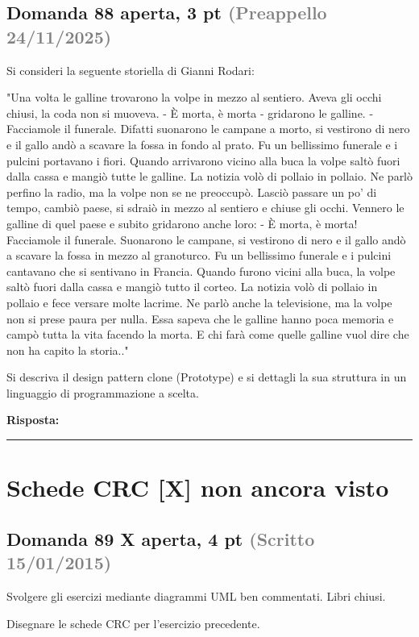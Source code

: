 \documentclass[a4paper,11pt]{article}
\begin{document}
\subsection*{Domanda 88 \hfill {\small aperta, 3 pt \textcolor{gray}{(Preappello 24/11/2025)}}}
\begin{tcolorbox}[colback=gray!8,colframe=gray!50,title=Contesto]
Si consideri la seguente storiella di Gianni Rodari:

"Una volta le galline trovarono la volpe in mezzo al sentiero. Aveva gli occhi chiusi, la coda non si muoveva. - È morta, è morta - gridarono le galline. - Facciamole il funerale. Difatti suonarono le campane a morto, si vestirono di nero e il gallo andò a scavare la fossa in fondo al prato. Fu un bellissimo funerale e i pulcini portavano i fiori. Quando arrivarono vicino alla buca la volpe saltò fuori dalla cassa e mangiò tutte le galline.
La notizia volò di pollaio in pollaio. Ne parlò perfino la radio, ma la volpe non se ne preoccupò. Lasciò passare un po' di tempo, cambiò paese, si sdraiò in mezzo al sentiero e chiuse gli occhi. Vennero le galline di quel paese e subito gridarono anche loro: - È morta, è morta! Facciamole il funerale.
Suonarono le campane, si vestirono di nero e il gallo andò a scavare la fossa in mezzo al granoturco. Fu un bellissimo funerale e i pulcini cantavano che si sentivano in Francia. Quando furono vicini alla buca, la volpe saltò fuori dalla cassa e mangiò tutto il corteo.
La notizia volò di pollaio in pollaio e fece versare molte lacrime. Ne parlò anche la televisione, ma la volpe non si prese paura per nulla. Essa sapeva che le galline hanno poca memoria e campò tutta la vita facendo la morta. E chi farà come quelle galline vuol dire che non ha capito la storia.."
\end{tcolorbox}
Si descriva il design pattern clone (Prototype) e si dettagli la sua struttura in un linguaggio di programmazione a scelta.

\vspace{0.2cm}
\noindent\textbf{Risposta:}\par
\vspace{4cm}\hrule


\section{Schede CRC [X] non ancora visto}

\subsection*{Domanda 89 X \hfill {\small aperta, 4 pt \textcolor{gray}{(Scritto 15/01/2015)}}}
\begin{tcolorbox}[colback=gray!8,colframe=gray!50,title=Contesto]
Svolgere gli esercizi mediante diagrammi UML ben commentati. Libri chiusi.
\end{tcolorbox}
Disegnare le schede CRC per l'esercizio precedente.
\end{document}

